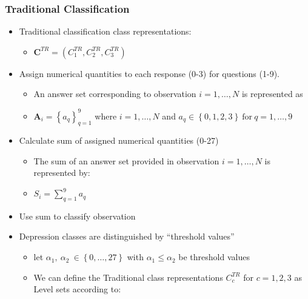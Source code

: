 \documentclass[12pt,]{article}
\providecommand{\tightlist}{%
  \setlength{\itemsep}{0pt}\setlength{\parskip}{0pt}}
\begin{document}
\hypertarget{traditional-classification}{%
\subsubsection{Traditional
Classification}\label{traditional-classification}}

\begin{itemize}
\tightlist
\item
  Traditional classification class representations:

  \begin{itemize}
  \tightlist
  \item
    \(\mathbf{C}^{TR}=\left(C_{1}^{TR}, C_{2}^{TR},C_{3}^{TR} \right)\)
  \end{itemize}
\item
  Assign numerical quantities to each response (0-3) for questions
  (1-9).

  \begin{itemize}
  \tightlist
  \item
    An answer set corresponding to observation \(i=1,\ldots,N\) is
    represented as
  \item
    \(\mathbf{A}_{i} = \left \{a_{q}\right \}_{q=1}^{9}\) where
    \(i=1,\ldots, N\) and
    \(a_{q}\in\left \{ 0,1,2,3 \right \} \ \text{for} \ q=1,\ldots,9\)
  \end{itemize}
\item
  Calculate sum of assigned numerical quantities (0-27)

  \begin{itemize}
  \tightlist
  \item
    The sum of an answer set provided in observation \(i=1,\ldots,N\) is
    represented by:
  \item
    \(S_{i} = \sum_{q=1}^{9} a_{q}\)
  \end{itemize}
\item
  Use sum to classify observation
\item
  Depression classes are distinguished by ``threshold values''

  \begin{itemize}
  \tightlist
  \item
    let
    \(\alpha_{1}, \ \alpha_{2} \ \in \left \{ 0, \ldots, 27 \right \}\)
    with \(\alpha_{1} \leq \alpha_{2}\) be threshold values
  \item
    We can define the Traditional class representations \(C_{c}^{TR}\)
    for \(c=1,2,3\) as Level sets according to:


\end{itemize}
\end{itemize}
\end{document}
